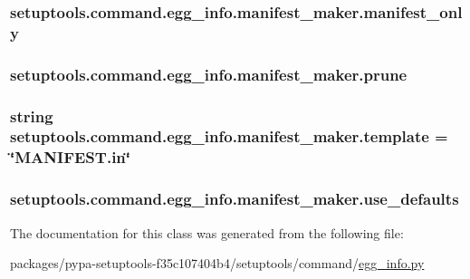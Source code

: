 \subsubsection[{manifest\+\_\+only}]{\setlength{\rightskip}{0pt plus 5cm}setuptools.\+command.\+egg\+\_\+info.\+manifest\+\_\+maker.\+manifest\+\_\+only}\label{classsetuptools_1_1command_1_1egg__info_1_1manifest__maker_ab9aeb0d36a2c63a0db350982766d73b6}
\hypertarget{classsetuptools_1_1command_1_1egg__info_1_1manifest__maker_a9c8082ebc71151c0b73f6bd1a3e136a4}{}
\subsubsection[{prune}]{\setlength{\rightskip}{0pt plus 5cm}setuptools.\+command.\+egg\+\_\+info.\+manifest\+\_\+maker.\+prune}\label{classsetuptools_1_1command_1_1egg__info_1_1manifest__maker_a9c8082ebc71151c0b73f6bd1a3e136a4}
\hypertarget{classsetuptools_1_1command_1_1egg__info_1_1manifest__maker_acb1f35c6c3f77ec6f79bf0eff75700f2}{}
\subsubsection[{template}]{\setlength{\rightskip}{0pt plus 5cm}string setuptools.\+command.\+egg\+\_\+info.\+manifest\+\_\+maker.\+template = \char`\"{}M\+A\+N\+I\+F\+E\+S\+T.\+in\char`\"{}\hspace{0.3cm}{\ttfamily [static]}}\label{classsetuptools_1_1command_1_1egg__info_1_1manifest__maker_acb1f35c6c3f77ec6f79bf0eff75700f2}
\hypertarget{classsetuptools_1_1command_1_1egg__info_1_1manifest__maker_a03b10f5d9682f7561f5dcb2e38f481c1}{}
\subsubsection[{use\+\_\+defaults}]{\setlength{\rightskip}{0pt plus 5cm}setuptools.\+command.\+egg\+\_\+info.\+manifest\+\_\+maker.\+use\+\_\+defaults}\label{classsetuptools_1_1command_1_1egg__info_1_1manifest__maker_a03b10f5d9682f7561f5dcb2e38f481c1}


The documentation for this class was generated from the following file\+:\begin{DoxyCompactItemize}
\item 
packages/pypa-\/setuptools-\/f35c107404b4/setuptools/command/\hyperlink{egg__info_8py}{egg\+\_\+info.\+py}\end{DoxyCompactItemize}
